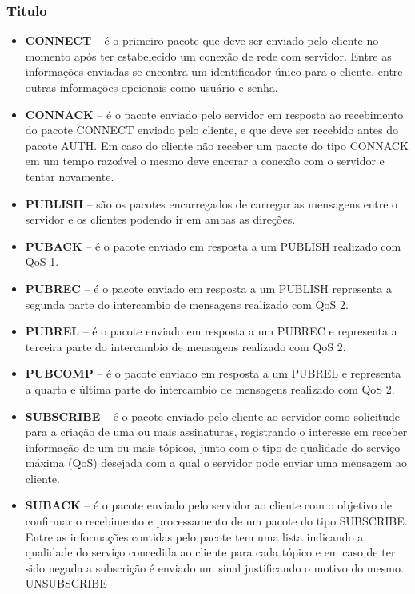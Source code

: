 \documentclass[12pt]{beamer}
\begin{document}
\begin{frame}[allowframebreaks]
    \frametitle{Titulo}
    \begin{itemize}
        \item \textbf{CONNECT} – é o primeiro pacote que deve ser enviado pelo cliente no momento após ter estabelecido um conexão de rede com servidor. Entre as informações enviadas se encontra um identificador único para o cliente, entre outras informações opcionais como usuário e senha.
        \item \textbf{CONNACK} – é o pacote enviado pelo servidor em resposta ao recebimento do pacote CONNECT enviado pelo cliente, e que deve ser recebido antes do pacote AUTH. Em caso do cliente não receber um pacote do tipo CONNACK em um tempo razoável o mesmo deve encerar a conexão com o servidor e tentar novamente.
        \item \textbf{PUBLISH} – são os pacotes encarregados de carregar as mensagens entre o servidor e os clientes podendo ir em ambas as direções.
        \item \textbf{PUBACK} – é o pacote enviado em resposta a um PUBLISH realizado com QoS 1.
        \item \textbf{PUBREC} – é o pacote enviado em resposta a um PUBLISH representa a segunda parte do intercambio de mensagens realizado com QoS 2.
        \item \textbf{PUBREL} – é o pacote enviado em resposta a um PUBREC e representa a terceira parte do intercambio de mensagens realizado com QoS 2.
        \item \textbf{PUBCOMP} – é o pacote enviado em resposta a um PUBREL e representa a quarta e última parte do intercambio de mensagens realizado com QoS 2.
        \item \textbf{SUBSCRIBE} – é o pacote enviado pelo cliente ao servidor como solicitude para a criação de uma ou mais assinaturas, registrando o interesse em receber informação de um ou mais tópicos, junto com o tipo de qualidade do serviço máxima (QoS) desejada com a qual o servidor pode enviar uma mensagem ao cliente.
        \item \textbf{SUBACK} – é o pacote enviado pelo servidor ao cliente com o objetivo de confirmar o recebimento e processamento de um pacote do tipo SUBSCRIBE. Entre as informações contidas pelo pacote tem uma lista indicando a qualidade do serviço concedida ao cliente para cada tópico e em caso de ter sido negada a subscrição é enviado um sinal justificando o motivo do mesmo.
            UNSUBSCRIBE
    \end{itemize}
\end{frame}
\end{document}
